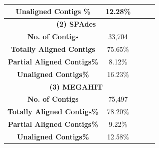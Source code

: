 \begin{table}[h]
\begin{tabular}{|c|c|c|c|c|}
\hline
\textbf{Unaligned Contigs \%}&12.28\%&  &   \\   
\hline
\multicolumn{4}{|c|}{ \textbf{(2) SPAdes} }   \\ [0.5ex] %
\hline
\textbf{No. of Contigs} &33,704&&    \\   
\hline
\textbf{Totally Aligned Contigs} &75.65\%&  &   \\   
\hline
\textbf{Partial Aligned Contigs\%}&8.12\%&  &   \\   
\hline
\textbf{Unaligned Contigs\%}&16.23\%&  &   \\   
\hline
\multicolumn{4}{|c|}{ \textbf{(3) MEGAHIT} }    \\ [0.5ex] %
\hline
\textbf{No. of Contigs}&75,497&&    \\   
\hline
\textbf{Totally Aligned Contigs\%} &78.20\%&  &   \\   
\hline
\textbf{Partial Aligned Contigs\%}&9.22\%&  &   \\   
\hline
\textbf{Unaligned Contigs\%}&12.58\% &  &   \\   
\hline
\end{tabular}
\label{table:contigs-analysis}
\end{table}





